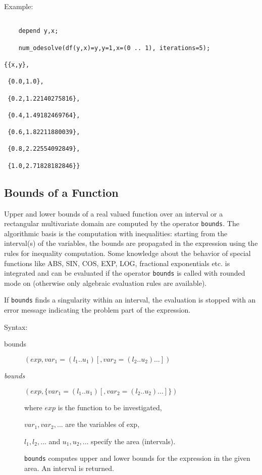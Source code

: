 Example:
\begin{verbatim}

    depend y,x;

    num_odesolve(df(y,x)=y,y=1,x=(0 .. 1), iterations=5);

{{x,y},

 {0.0,1.0},

 {0.2,1.22140275816},

 {0.4,1.49182469764},

 {0.6,1.82211880039},

 {0.8,2.22554092849},

 {1.0,2.71828182846}}

\end{verbatim}


\subsection{Bounds of a Function}
\hypertarget{operator:BOUNDS}{}

Upper and lower bounds of a real valued function over an
interval or a rectangular multivariate domain are computed
by the operator \texttt{bounds}. The algorithmic basis is the computation
with inequalities: starting from the interval(s) of the
variables, the bounds are propagated in the expression
using the rules for inequality computation. Some knowledge
about the behavior of special functions like ABS, SIN, COS, EXP, LOG,
fractional exponentials etc. is integrated and can be evaluated
if the operator \texttt{bounds} is called with rounded mode on
(otherwise only algebraic evaluation rules are available).

If \texttt{bounds} finds a singularity within an interval, the evaluation
is stopped with an error message indicating the problem part
of the expression.

Syntax:
\begin{description}
\item[bounds]$(exp,var_1=(l_1 .. u_1) [,var_2=(l_2 .. u_2) \ldots])$

\item[\textit{bounds}]$(exp,\{var_1=(l_1 .. u_1) [,var_2=(l_2 .. u_2)\ldots]\})$

where $exp$ is the function to be investigated,

$var_1, var_2 , \ldots$ are the variables of exp,

$l_1, l_2 , \ldots$  and  $u_1, u_2 , \ldots$ specify the area (intervals).

\texttt{bounds} computes upper and lower bounds for the expression in the
given area. An interval is returned.

\end{description}

